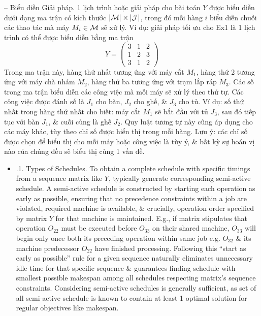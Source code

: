 \documentclass{article}
\begin{document}
\begin{itemize}
\begin{itemize}
        -- {\sf Biểu diễn Giải pháp.} 1 lịch trình hoặc giải pháp cho bài toán $Y$ được biểu diễn dưới dạng ma trận có kích thước $|{\cal M}|\times|{\cal J}|$, trong đó mỗi hàng $i$ biểu diễn chuỗi các thao tác mà máy $M_i\in{\cal M}$ sẽ xử lý. Ví dụ: giải pháp tối ưu cho Ex1 là 1 lịch trình có thể được biểu diễn bằng ma trận
        \begin{equation*}
            Y = \begin{pmatrix}
                3 & 1 & 2\\1 & 2 & 3\\3 & 1 & 2
            \end{pmatrix}
        \end{equation*}
        Trong ma trận này, hàng thứ nhất tương ứng với máy cắt $M_1$, hàng thứ 2 tương ứng với máy chà nhám $M_2$, hàng thứ ba tương ứng với trạm lắp ráp $M_3$. Các số trong ma trận biểu diễn các công việc mà mỗi máy sẽ xử lý theo thứ tự. Các công việc được đánh số là $J_1$ cho bàn, $J_2$ cho ghế, \& $J_3$ cho tủ. Ví dụ: số thứ nhất trong hàng thứ nhất cho biết: máy cắt $M_1$ sẽ bắt đầu với tủ $J_3$, sau đó tiếp tục với bàn $J_1$, \& cuối cùng là ghế $J_2$. Quy luật tương tự này cũng áp dụng cho các máy khác, tùy theo chỉ số được hiển thị trong mỗi hàng. Lưu ý: các chỉ số được chọn để biểu thị cho mỗi máy hoặc công việc là tùy ý, \& bất kỳ sự hoán vị nào của chúng đều sẽ biểu thị cùng 1 vấn đề.
        \begin{itemize}
            \item {.1. Types of Schedules.} To obtain a complete schedule with specific timings from a sequence matrix like $Y$, typically generate corresponding semi-active schedule. A semi-active schedule is constructed by starting each operation as early as possible, ensuring that no precedence constraints within a job are violated, required machine is available, \& crucially, operation order specified by matrix $Y$ for that machine is maintained. E.g., if matrix stipulates that operation $O_{22}$ must be executed before $O_{33}$ on their shared machine, $O_{33}$ will begin only once both its preceding operation within same job e.g. $O_{32}$ \& its machine predecessor $O_{22}$ have finished processing. Following this ``start as early as possible'' rule for a given sequence naturally eliminates unnecessary idle time for that specific sequence \& guarantees finding schedule with smallest possible makespan among all schedules respecting matrix's sequence constraints. Considering semi-active schedules is generally sufficient, as set of all semi-active schedule is known to contain at least 1 optimal solution for regular objectives like makespan.


\end{itemize}
\end{itemize}
\end{itemize}
\end{document}
